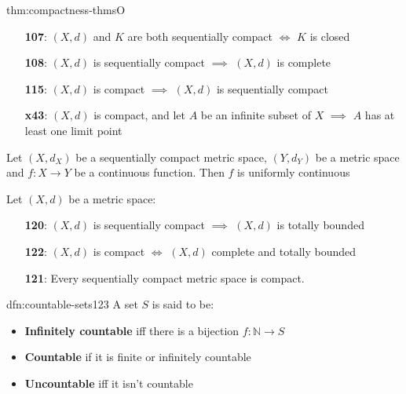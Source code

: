 \documentclass[landscape, 8pt]{extarticle}
\begin{document}
\begin{multicols}{3}
\begin{thm}{thm:compactness-thms}{O}
\begin{itemize}[leftmargin=1.5em]
        \item[\textbf{107}:] $(X, d)$ and $K$ are both sequentially compact $\iff$ $K$ is closed

        \item[\textbf{108}:] $(X, d)$ is sequentially compact $\implies$ $(X, d)$ is complete

    \item[\textbf{115}:] $(X, d)$ is compact $\implies$ $(X, d)$ is sequentially compact

    \item[\textbf{x43}:] $(X, d)$ is compact, and let $A$ be an infinite subset of $X$ $\implies$ $A$ has at least one limit point
    \end{itemize}

    \vspace{-5pt}
    \vspace{-2pt}

    Let $(X, d_{X})$ be a sequentially compact metric space, $(Y, d_{Y})$ be a metric space and $f : X\to Y$ be a continuous function. Then $f$ is uniformly continuous

    \vspace{-3pt}

    Let $(X, d)$ be a metric space:
    \vspace{-5pt}
    \begin{itemize}[leftmargin=1.5em]
        \item[\textbf{120}:] $(X, d)$ is sequentially compact $\implies$ $(X, d)$ is totally bounded
        \item[\textbf{122}:] $(X, d)$ is compact $\iff$ $(X, d)$ complete and totally bounded
        \item[\textbf{121}:] Every sequentially compact metric space is compact.
    \end{itemize}
\end{thm}

\newpage


\begin{dfn}{dfn:countable-sets}{123}
    \vspace{-5pt}
    A set $S$ is said to be:
    \vspace{-5pt}
    \begin{itemize}
        \item \textbf{Infinitely countable} iff there is a bijection $f : \mathbb{N} \to S$
        \item \textbf{Countable} if it is finite or infinitely countable
        \item \textbf{Uncountable} iff it isn't countable
    \end{itemize}


\end{dfn}
\end{multicols}
\end{document}
